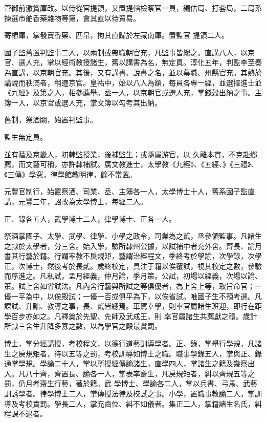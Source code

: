 \begin{pinyinscope}
 管御前激賞庫改。以侍從官提領，又置提轄檢察官一員，編估局、打套局，二局系揀選市舶香藥雜物等第，會其直以待貿易。



 寄樁庫，掌發賣香藥、匹帛，拘其直歸於左藏南庫。置監官
 提領二人。



 國子監舊置判監事二人，以兩制或帶職朝官充，凡監事皆總之。直講八人，以京官、選人充，掌以經術教授諸生，舊以講書為名，無定員。淳化五年，判監李至奏為直講，以京朝官充。其後，又有講書、說書之名，並以幕職、州縣官充。其熟於講說而秩滿者，稍遷京官。皇祐中，始以八人為額，每員各專一經，並選擇進士並《九經》及第之人，相參薦舉。丞一人，以京朝官或選人充，掌錢穀出納之事。主簿一人，以京官或選人充，掌文簿以勾考其出納。



 舊制，祭酒闕，始置判監事。



 監生無定員。



 並有蔭及京畿人，初隸監授業，後補監生；或隨屬游官，以
 久離本貫，不克赴鄉薦，而文藝可稱，亦許隸補試。廣文教進士，太學教《九經》、《五經、》《三禮》、《三傳》學究，律學館教明律，餘不常置。



 元豐官制行，始置察酒、司業、丞、主簿各一人，太學博士十人，舊系國子監直講，元豐三年，詔改為太學博士，每經二人。



 正、錄各五人，武學博士二人，律學博士、正各一人。



 祭酒掌國子、太學、武學、律學、小學之政令，司業為之貳，丞參領監事。凡諸生之隸於太學者，分三舍。始入學，驗所隸州公據，以試補中者充外舍。齊長、諭月書其行藝於籍。行謂率教不戾規矩，藝謂治經程文，季終考於學諭，次學錄，次學
 正，次博士，然後考於長貳。歲終校定，具注于籍以俟覆試，視其校定之數，參驗而序進之。凡私試，孟月經義，仲月論，季月策。公試，初場以經義，次場以論、策。試上舍如省試法。凡內舍行藝與所試之等俱優者，為上舍上等，取旨命官；一優一平為中，以俟殿試；一優一否或俱平為下，以俟省試。唯國子生不預考選。凡課試、升黜、教導之事，長、貳皆總焉。車駕幸學，則率官屬諸生班迎，即行在距學百步亦如之。凡釋奠於先聖、先師及武成王，則
 率官屬諸生共薦獻之禮。歲計所隸三舍生升降多寡之數，以為學官之殿最賞罰。



 博士，掌分經講授，考校程文，以德行道藝訓導學者。正、錄，掌舉行學規，凡諸生之戾規矩者，待以五等之罰，考校訓導如博士之職。職事學錄五人，掌與正、錄通掌學規。學諭二十人，掌以所授經傳諭諸生，直學四人，掌諸生之籍及幾察出入。凡八十齊，齊置長、諭各一人，掌表率齋生，凡戾規矩者，糾以齊規五等之罰，仍月考齋生行藝，著於籍。武
 學博士、學諭各二人，掌以兵書、弓馬、武藝訓誘學者。律學博士二人，掌傳授法律及校試之事。小學，置職事教諭二人，掌訓導及考校責罰。學長二人，掌充齒位、糾不如儀者。集正二人，掌籍諸生名氏，糾程課不逮者。




\end{pinyinscope}

